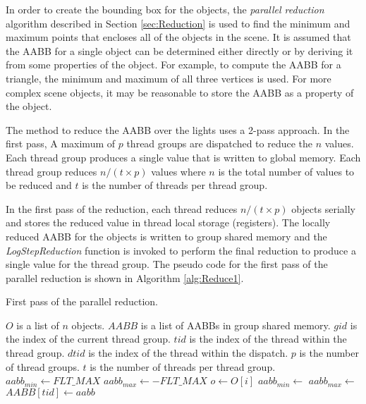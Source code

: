 In order to create the bounding box for the objects, the \emph{parallel reduction} algorithm described in Section \ref{sec:Reduction} is used to find the minimum and maximum points that encloses all of the objects in the scene. It is assumed that the AABB for a single object can be determined either directly or by deriving it from some properties of the object. For example, to compute the AABB for a triangle, the minimum and maximum of all three vertices is used. For more complex scene objects, it may be reasonable to store the AABB as a property of the object.

The method to reduce the AABB over the lights uses a 2-pass approach. In the first pass, A maximum of $p$ thread groups are dispatched to reduce the $n$ values. Each thread group produces a single value that is written to global memory. Each thread group reduces $n/(t\times p)$ values where $n$ is the total number of values to be reduced and $t$ is the number of threads per thread group.

In the first pass of the reduction, each thread reduces $n/(t \times p)$ objects serially and stores the reduced value in thread local storage (registers). The locally reduced AABB for the objects is written to group shared memory and the \emph{LogStepReduction} function is invoked to perform the final reduction to produce a single value for the thread group. The pseudo code for the first pass of the parallel reduction is shown in Algorithm \ref{alg:Reduce1}.

\begin{algorithm}[H]
\caption{First pass of the parallel reduction.}
\label{alg:Reduce1}
\begin{algorithmic}[1]
\Require $O$ is a list of $n$ objects.
\Require $AABB$ is a list of AABBs in group shared memory.
\Require $gid$ is the index of the current thread group.
\Require $tid$ is the index of the thread within the thread group.
\Require $dtid$ is the index of the thread within the dispatch.
\Require $p$ is the number of thread groups.
\Require $t$ is the number of threads per thread group.
\State $aabb_{min} \gets  FLT\_MAX$
\State $aabb_{max} \gets -FLT\_MAX$
\State $o \gets O[i]$
\State $aabb_{min} \gets$ 
\State $aabb_{max} \gets$ 
\EndFor
\State $AABB[tid] \gets aabb$
\State {}
\EndFunction
\end{algorithmic}
\end{algorithm}

